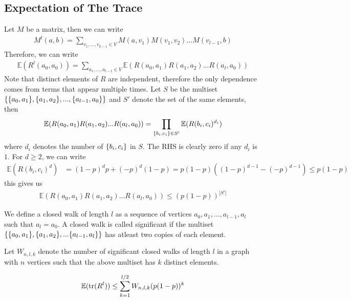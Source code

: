 \documentclass{math}
\newcommand{\expect}{\mathbb{E}}
\begin{document}
\subsection{Expectation of The Trace}

Let $M$ be a matrix, then we can write
\begin{align*}
    M^l(a, b) = \sum_{v_1, ..., v_{k - 1} \in V} M(a, v_1) M(v_1, v_2) ... M(v_{l - 1}, b)
\end{align*}
Therefore, we can write
\begin{align*}
    \expect(R^l(a_0, a_0)) = \sum_{a_1, ..., a_{l-1} \in V} \expect(R(a_0, a_1) R(a_1, a_2) ... R(a_l, a_0))
\end{align*}
Note that distinct elements of $R$ are independent, therefore the only dependence comes from terms that appear multiple times.
Let $S$ be the multiset $\{ \{ a_0, a_1 \}, \{ a_1, a_2 \}, ..., \{ a_{l-1}, a_0 \} \}$ and $S'$ denote the set of the same elements, then
\begin{align*}
    \expect(R(a_0, a_1) R(a_1, a_2) ... R(a_l, a_0)) = \prod_{\set{b_i, c_i} \in S'} \expect(R(b_i, c_i)^{d_i})
\end{align*}
where $d_i$ denotes the number of $\{ b_i, c_i \}$ in $S$.
The RHS is clearly zero if any $d_i$ is $1$. For $d \geq 2$, we can write
\begin{align*}
    \expect(R(b_i, c_i)^d) & = (1 - p)^d p + (-p)^d (1 - p) = p(1 - p) \left((1-p)^{d - 1} - (-p)^{d-1}\right) \leq p(1 - p)
\end{align*}
this gives us
\begin{align*}
    \expect(R(a_0, a_1) R(a_1, a_2) ... R(a_l, a_0)) \leq (p(1-p))^{|S'|}
\end{align*}

We define a closed walk of length $l$ as a sequence of vertices $a_0, a_1, ..., a_{l - 1}, a_l$ such that $a_l = a_0$.
A closed walk is called significant if the multiset $\{ \{ a_0, a_1 \}, \{ a_1, a_2 \}, ... \{ a_{l-1}, a_l \} \}$ has atleast two copies of each element.

\begin{definition}
    Let $W_{n, l, k}$ denote the number of significant closed walks of length $l$ in a graph with $n$ vertices such that the above multiset has $k$ distinct elements.
\end{definition}

\begin{lemma}
    \begin{align*}
        \expect(\trace(R^l)) \leq \sum_{k = 1}^{l / 2} W_{n, l, k} (p(1-p))^k
    \end{align*}
\end{lemma}
\end{document}
